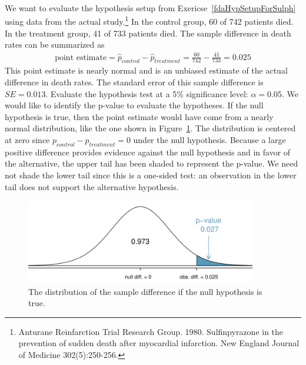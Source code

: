 \begin{example}{We want to evaluate the hypothesis setup from Exericse~\ref{fdaHypSetupForSulph} using data from the actual study.\footnote{Anturane Reinfarction Trial Research Group. 1980. Sulfinpyrazone in the prevention of sudden death after myocardial infarction. New England Journal of Medicine 302(5):250-256.} In the control group, 60 of 742 patients died. In the treatment group, 41 of 733 patients died. The sample difference in death rates can be summarized as
\begin{eqnarray*}
\text{point estimate} = \hat{p}_{control} - \hat{p}_{treatment} = \frac{60}{742} - \frac{41}{733} = 0.025
\end{eqnarray*}
This point estimate is nearly normal and is an unbiased estimate of the actual difference in death rates. The standard error of this sample difference is $SE = 0.013$. Evaluate the hypothesis test at a 5\% significance level: $\alpha=0.05$.}
We would like to identify the p-value to evaluate the hypotheses. If the null hypothesis is true, then the point estimate would have come from a nearly normal distribution, like the one shown in Figure~\ref{sulphStudyFindPValueUsingNormalApprox}. The distribution is centered at zero since $p_{control}-p_{treatment}=0$ under the null hypothesis. Because a large positive difference provides evidence against the null hypothesis and in favor of the alternative, the upper tail has been shaded to represent the p-value. We need not shade the lower tail since this is a one-sided test: an observation in the lower tail does not support the alternative hypothesis.

\begin{figure}[bt]
   \centering
   \includegraphics[height=37mm]{ch_inference_foundations/figures/sulphStudyFindPValueUsingNormalApprox/sulphStudyFindPValueUsingNormalApprox}
   \caption{The distribution of the sample difference if the null hypothesis is true.}
   \label{sulphStudyFindPValueUsingNormalApprox}
\end{figure}


\end{example}

